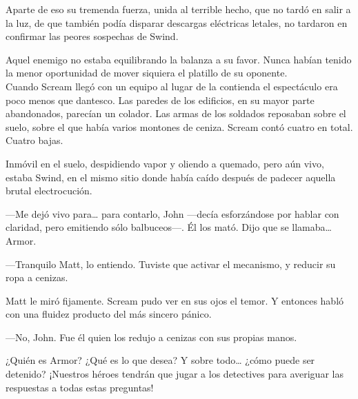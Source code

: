 Aparte de eso su tremenda fuerza, unida al terrible hecho, que no tardó en salir a la luz, de que también podía disparar descargas eléctricas letales, no tardaron en confirmar las peores sospechas de Swind.

Aquel enemigo no estaba equilibrando la balanza a su favor. Nunca habían tenido la menor oportunidad de mover siquiera el platillo de su oponente.\\

\noindent{}Cuando Scream llegó con un equipo al lugar de la contienda el espectáculo era poco menos que dantesco. Las paredes de los edificios, en su mayor parte abandonados, parecían un colador. Las armas de los soldados reposaban sobre el suelo, sobre el que había varios montones de ceniza. Scream contó cuatro en total. Cuatro bajas.

Inmóvil en el suelo, despidiendo vapor y oliendo a quemado, pero aún vivo, estaba Swind, en el mismo sitio donde había caído después de padecer aquella brutal electrocución.

---Me dejó vivo para\dots{} para contarlo, John ---decía esforzándose por hablar con claridad, pero emitiendo sólo balbuceos---. Él los mató. Dijo que se llamaba\dots{} Armor.

---Tranquilo Matt, lo entiendo. Tuviste que activar el mecanismo, y reducir su ropa a cenizas.

Matt le miró fijamente. Scream pudo ver en sus ojos el temor. Y entonces habló con una fluidez producto del más sincero pánico.

---No, John. Fue él quien los redujo a cenizas con sus propias manos.

\begin{next}
    ¿Quién es Armor? ¿Qué es lo que desea? Y sobre todo\dots{} ¿cómo puede ser detenido? ¡Nuestros héroes tendrán que jugar a los detectives para averiguar las respuestas a todas estas preguntas!
\end{next}

\endinput
